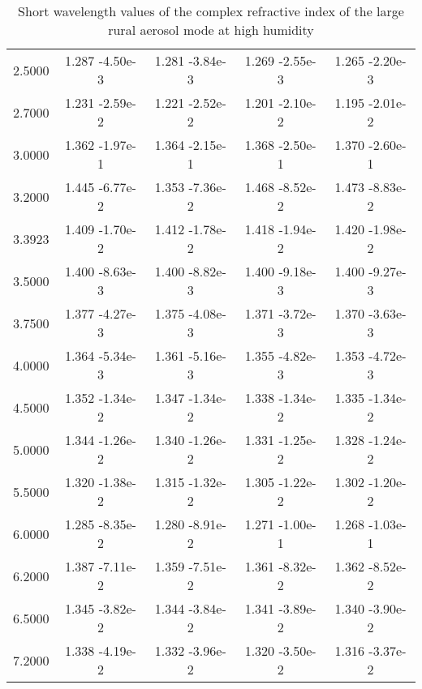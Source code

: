 \documentclass[12pt]{article}
\begin{document}
\begin{center}
\begin{table}
\begin{tabular}{| c | c | c | c | c |  }
2.5000 &    1.287   -4.50e-3 &   1.281   -3.84e-3 &   1.269   -2.55e-3 &   1.265   -2.20e-3  \\
2.7000 &    1.231   -2.59e-2 &   1.221   -2.52e-2 &   1.201   -2.10e-2 &   1.195   -2.01e-2  \\
3.0000 &    1.362   -1.97e-1 &   1.364   -2.15e-1 &   1.368   -2.50e-1 &   1.370   -2.60e-1  \\
3.2000 &    1.445   -6.77e-2 &   1.353   -7.36e-2 &   1.468   -8.52e-2 &   1.473   -8.83e-2  \\
3.3923 &    1.409   -1.70e-2 &   1.412   -1.78e-2 &   1.418   -1.94e-2 &   1.420   -1.98e-2  \\
3.5000 &    1.400   -8.63e-3 &   1.400   -8.82e-3 &   1.400   -9.18e-3 &   1.400   -9.27e-3  \\
3.7500 &    1.377   -4.27e-3 &   1.375   -4.08e-3 &   1.371   -3.72e-3 &   1.370   -3.63e-3  \\
4.0000 &    1.364   -5.34e-3 &   1.361   -5.16e-3 &   1.355   -4.82e-3 &   1.353   -4.72e-3  \\
4.5000 &    1.352   -1.34e-2  &  1.347   -1.34e-2 &   1.338   -1.34e-2 &   1.335   -1.34e-2  \\
5.0000 &    1.344   -1.26e-2 &   1.340   -1.26e-2 &   1.331   -1.25e-2 &   1.328   -1.24e-2  \\
5.5000 &    1.320   -1.38e-2  &  1.315   -1.32e-2  &  1.305   -1.22e-2 &   1.302   -1.20e-2  \\
6.0000 &    1.285   -8.35e-2 &   1.280   -8.91e-2 &   1.271   -1.00e-1  &  1.268   -1.03e-1  \\
6.2000 &    1.387   -7.11e-2 &   1.359   -7.51e-2 &   1.361   -8.32e-2  &  1.362   -8.52e-2  \\
6.5000 &    1.345   -3.82e-2 &   1.344   -3.84e-2 &   1.341   -3.89e-2  &  1.340   -3.90e-2  \\
7.2000 &    1.338   -4.19e-2 &   1.332   -3.96e-2 &   1.320   -3.50e-2  &  1.316   -3.37e-2  \\
\hline
\end{tabular}
\caption{Short wavelength values of the complex refractive index of the large rural aerosol mode at high humidity}
\end{table}
\end{center}
\end{document}
